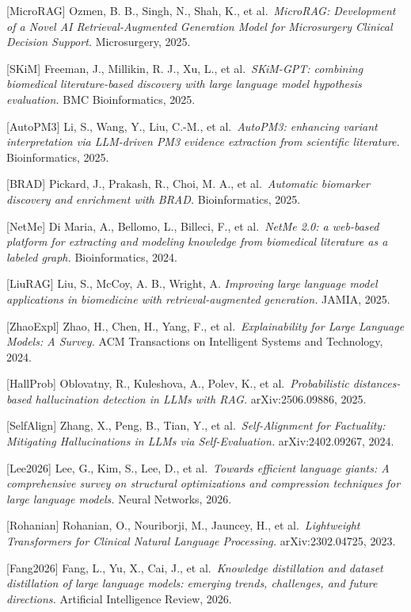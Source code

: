{[}MicroRAG{]} Ozmen, B. B., Singh, N., Shah, K., et al.~\emph{MicroRAG: Development of a Novel AI Retrieval-Augmented Generation Model for Microsurgery Clinical Decision Support.} Microsurgery, 2025.

{[}SKiM{]} Freeman, J., Millikin, R. J., Xu, L., et al.~\emph{SKiM-GPT: combining biomedical literature-based discovery with large language model hypothesis evaluation.} BMC Bioinformatics, 2025.

{[}AutoPM3{]} Li, S., Wang, Y., Liu, C.-M., et al.~\emph{AutoPM3: enhancing variant interpretation via LLM-driven PM3 evidence extraction from scientific literature.} Bioinformatics, 2025.

{[}BRAD{]} Pickard, J., Prakash, R., Choi, M. A., et al.~\emph{Automatic biomarker discovery and enrichment with BRAD.} Bioinformatics, 2025.

{[}NetMe{]} Di Maria, A., Bellomo, L., Billeci, F., et al.~\emph{NetMe 2.0: a web-based platform for extracting and modeling knowledge from biomedical literature as a labeled graph.} Bioinformatics, 2024.

{[}LiuRAG{]} Liu, S., McCoy, A. B., Wright, A. \emph{Improving large language model applications in biomedicine with retrieval-augmented generation.} JAMIA, 2025.

{[}ZhaoExpl{]} Zhao, H., Chen, H., Yang, F., et al.~\emph{Explainability for Large Language Models: A Survey.} ACM Transactions on Intelligent Systems and Technology, 2024.

{[}HallProb{]} Oblovatny, R., Kuleshova, A., Polev, K., et al.~\emph{Probabilistic distances-based hallucination detection in LLMs with RAG.} arXiv:2506.09886, 2025.

{[}SelfAlign{]} Zhang, X., Peng, B., Tian, Y., et al.~\emph{Self-Alignment for Factuality: Mitigating Hallucinations in LLMs via Self-Evaluation.} arXiv:2402.09267, 2024.

{[}Lee2026{]} Lee, G., Kim, S., Lee, D., et al.~\emph{Towards efficient language giants: A comprehensive survey on structural optimizations and compression techniques for large language models.} Neural Networks, 2026.

{[}Rohanian{]} Rohanian, O., Nouriborji, M., Jauncey, H., et al.~\emph{Lightweight Transformers for Clinical Natural Language Processing.} arXiv:2302.04725, 2023.

{[}Fang2026{]} Fang, L., Yu, X., Cai, J., et al.~\emph{Knowledge distillation and dataset distillation of large language models: emerging trends, challenges, and future directions.} Artificial Intelligence Review, 2026.

